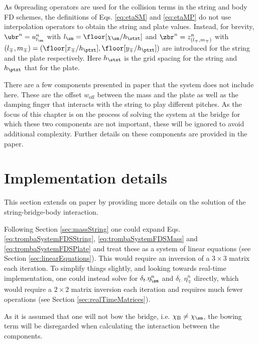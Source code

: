 As $0$\thOrder spreading operators are used for the collision terms in the string and body FD schemes, the definitions of Eqs. \eqref{eq:etaSM} and \eqref{eq:etaMP} do not use interpolation operators to obtain the string and plate values. Instead, for brevity, $\ubr^n = u_{l_\sm}^n$ with $l_\sm = \floor[\chi_\sm / h_\stxt]$ and $\zbr^n = z_{(l_\mp, m_\mp)}^n$ with $(l_\mp, m_\mp) = (\floor[x_\mp / h_\ptxt], \floor[y_\mp / h_\ptxt])$ are introduced for the string and the plate respectively. Here $h_\stxt$ is the grid spacing for the string and $h_\ptxt$ that for the plate. 

There are a few components presented in paper \citeP[D] that the system does not include here. These are the offset $w_\text{off}$ between the mass and the plate as well as the damping finger that interacts with the string to play different pitches. As the focus of this chapter is on the process of solving the system at the bridge for which these two components are not important, these will be ignored to avoid additional complexity. Further details on these components are provided in the paper.

\section{Implementation details}
This section extends on paper \citeP[D] by providing more details on the solution of the string-bridge-body interaction.

Following Section \ref{sec:massString} one could expand Eqs. \eqref{eq:trombaSystemFDSString}, \eqref{eq:trombaSystemFDSMass} and \eqref{eq:trombaSystemFDSPlate} and treat these as a system of linear equations (see Section \ref{sec:linearEquations}). This would require an inversion of a $3\times 3$ matrix each iteration.
To simplify things slightly, and looking towards real-time implementation, one could instead solve for $\delta_{t\cdot}\eta_\sm^n$ and $\delta_{t\cdot}\eta_\mp^n$ directly, which would require a $2\times 2$ matrix inversion each iteration and requires much fewer operations (see Section \ref{sec:realTimeMatrices}).

As it is assumed that one will not bow the bridge, i.e. $\chi_\text{B} \neq \chi_\sm$, the bowing term will be disregarded when calculating the interaction between the components. 

